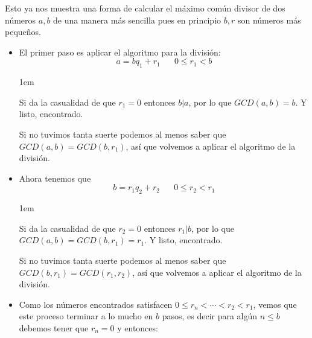 \documentclass[12pt, fleqn]{report}                             %
\newenvironment{SmallIndentation}[1][0.75em]                    %
    {\begin{adjustwidth}{#1}{}\begin{footnotesize}}                 %
    {\end{footnotesize}\end{adjustwidth}}                           %
\DeclareMathOperator \Space {\quad}                             %
\begin{document}
            Esto ya nos muestra una forma de calcular el máximo común divisor de dos
            números $a,b$ de una manera más sencilla pues en principio $b,r$ son
            números más pequeños.

            \begin{itemize}
                \item
                    El primer paso es aplicar el algoritmo para la división:
                    \begin{equation*}
                        a = bq_1 +r_1 \Space 0 \leq r_1 < b
                    \end{equation*}

                    \begin{SmallIndentation}[1em]
                        Si da la casualidad de que $r_1 = 0$ entonces $b|a$, por lo
                        que $GCD(a,b) = b$. Y listo, encontrado.

                        Si no tuvimos tanta suerte podemos al menos saber que
                        $GCD(a,b) = GCD(b,r_1)$, así que volvemos a aplicar el
                        algoritmo de la división.

                    \end{SmallIndentation}

                    
                \item
                    Ahora tenemos que 
                    \begin{equation*}
                        b = r_1q_2 +r_2 \Space 0 \leq r_2 < r_1
                    \end{equation*}

                    \begin{SmallIndentation}[1em]
                        Si da la casualidad de que $r_2 = 0$ entonces $r_1|b$, por lo
                        que $GCD(a,b) = GCD(b,r_1)=r_1$. Y listo, encontrado.

                        Si no tuvimos tanta suerte podemos al menos saber que
                        $GCD(b,r_1) = GCD(r_1,r_2)$, así que volvemos a aplicar el
                        algoritmo de la división.

                    \end{SmallIndentation}

                    


                \item
                    Como los números encontrados satisfacen $0 \leq r_n < \cdots < r_2 < r_1$,
                    vemos que este proceso terminar a lo mucho en $b$ pasos, es decir para algún
                    $n \leq b$ debemos tener que $r_n=0$ y entonces:


\end{itemize}
\end{document}
